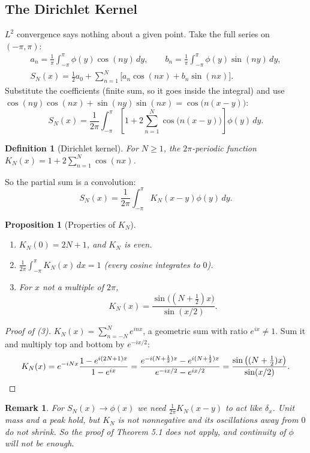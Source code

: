 \documentclass{article}
\newtheorem{definition}{Definition}
\newtheorem{remark}{Remark}
\newtheorem{proposition}{Proposition}
\begin{document}
\subsection{The Dirichlet Kernel}
$L^2$ convergence says nothing about a given point. Take the full series on $(-\pi,\pi)$:
\begin{gather}
    a_n = \frac1\pi\int_{-\pi}^\pi\phi(y)\cos(ny)\,dy, \qquad b_n = \frac1\pi\int_{-\pi}^\pi\phi(y)\sin(ny)\,dy, \\
    S_N(x) = \frac12a_0 + \sum_{n=1}^N\big[a_n\cos(nx) + b_n\sin(nx)\big].
\end{gather}
Substitute the coefficients (finite sum, so it goes inside the integral) and use $\cos(ny)\cos(nx) + \sin(ny)\sin(nx) = \cos\big(n(x-y)\big)$:
\begin{equation}
    S_N(x) = \frac{1}{2\pi}\int_{-\pi}^\pi\left[1 + 2\sum_{n=1}^N\cos\big(n(x-y)\big)\right]\phi(y)\,dy.
\end{equation}
\begin{definition}[Dirichlet kernel]
    For $N \geq 1$, the $2\pi$-periodic function $K_N(x) = 1 + 2\sum_{n=1}^N\cos(nx)$.
\end{definition}
So the partial sum is a convolution:
\begin{equation}\label{eq:SN-conv}
    S_N(x) = \frac{1}{2\pi}\int_{-\pi}^\pi K_N(x - y)\phi(y)\,dy.
\end{equation}
\begin{proposition}[Properties of $K_N$]
    \leavevmode
    \begin{enumerate}[label=(\arabic*)]
        \item $K_N(0) = 2N + 1$, and $K_N$ is even.
        \item $\frac{1}{2\pi}\int_{-\pi}^\pi K_N(x)\,dx = 1$ (every cosine integrates to $0$).
        \item For $x$ not a multiple of $2\pi$,
        \begin{equation}\label{eq:KN}
            K_N(x) = \frac{\sin\big((N+\frac12)x\big)}{\sin(x/2)}.
        \end{equation}
    \end{enumerate}
\end{proposition}
\begin{proof}[Proof of (3)]
    $K_N(x) = \sum_{n=-N}^N e^{inx}$, a geometric sum with ratio $e^{ix} \neq 1$. Sum it and multiply top and bottom by $e^{-ix/2}$:
    \begin{equation}
        K_N(x) = e^{-iNx}\frac{1 - e^{i(2N+1)x}}{1 - e^{ix}} = \frac{e^{-i(N+\frac12)x} - e^{i(N+\frac12)x}}{e^{-ix/2} - e^{ix/2}} = \frac{\sin\big((N+\frac12)x\big)}{\sin(x/2)}. \qedhere
    \end{equation}
\end{proof}
\begin{remark}
    For $S_N(x) \to \phi(x)$ we need $\frac{1}{2\pi}K_N(x - y)$ to act like $\delta_x$. Unit mass and a peak hold, but $K_N$ is not nonnegative and its oscillations away from $0$ do not shrink. So the proof of Theorem 5.1 does not apply, and continuity of $\phi$ will not be enough.
\end{remark}
\end{document}
